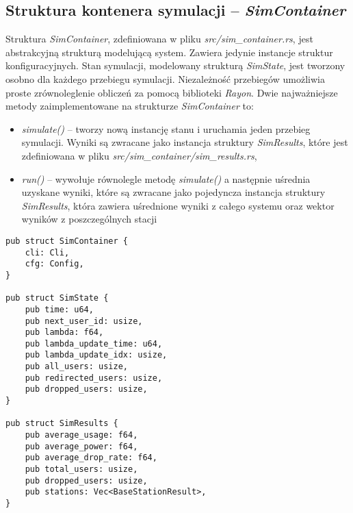 \subsection{Struktura kontenera symulacji -- \emph{SimContainer}}
Struktura \emph{SimContainer}, zdefiniowana w pliku \emph{src/sim\_container.rs}, jest abstrakcyjną strukturą modelującą system. Zawiera jedynie instancje struktur konfiguracyjnych. Stan symulacji, modelowany strukturą \emph{SimState}, jest tworzony osobno dla każdego przebiegu symulacji. Niezależność przebiegów umożliwia proste zrównoleglenie obliczeń za pomocą biblioteki \emph{Rayon}. Dwie najważniejsze metody zaimplementowane na strukturze \emph{SimContainer} to:
\begin{itemize}
\item \emph{simulate()} -- tworzy nową instancję stanu i uruchamia jeden przebieg symulacji. Wyniki są zwracane jako instancja struktury \emph{SimResults}, które jest zdefiniowana w pliku \emph{src/sim\_container/sim\_results.rs},
\item \emph{run()} -- wywołuje równolegle metodę \emph{simulate()} a następnie uśrednia uzyskane wyniki, które są zwracane jako pojedyncza instancja struktury \emph{SimResults}, która zawiera uśrednione wyniki z całego systemu oraz wektor wyników z poszczególnych stacji
\end{itemize}
{
\selectfont 
\begin{verbatim}
pub struct SimContainer {
    cli: Cli,
    cfg: Config,
}

pub struct SimState {
    pub time: u64,
    pub next_user_id: usize,
    pub lambda: f64,
    pub lambda_update_time: u64,
    pub lambda_update_idx: usize,
    pub all_users: usize,
    pub redirected_users: usize,
    pub dropped_users: usize,
}

pub struct SimResults {
    pub average_usage: f64,
    pub average_power: f64,
    pub average_drop_rate: f64,
    pub total_users: usize,
    pub dropped_users: usize,
    pub stations: Vec<BaseStationResult>,
}
\end{verbatim}
}
